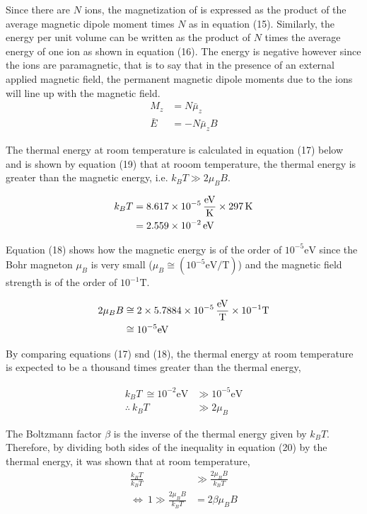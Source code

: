 \documentclass[a4paper,11pt]{article}
\begin{document}
Since there are $N$  ions, the magnetization of  is expressed as the product of the average magnetic dipole moment times $N$ as in equation (15). Similarly, the energy per unit volume can be written as the product of $N$ times the average energy of one  ion as shown in equation (16). The energy is negative however since the ions are paramagnetic, that is to say that in the presence of an external applied magnetic field, the permanent magnetic dipole moments due to the ions will line up with the magnetic field\cite{pellicane2018}.\\

\begin{align}
M_z	& = N \bar{\mu}_z\\
\bar{E}		& = - N \bar{\mu}_z B
\end{align}

The thermal energy at room temperature is calculated in equation (17) below and is shown by equation (19) that at rooom temperature, the thermal energy is greater than the magnetic energy, i.e. $k_B T \gg 2 \mu_B B$. 

\begin{align}
k_B T	& = \SI{8.617d-5}{\electronvolt\per\kelvin} \times \SI{297}{\kelvin}\nonumber\\
		& = \SI{2.559d-2}{\electronvolt}
\end{align}

Equation (18) shows how the magnetic energy is of the order of ${10^{-5}}\si{\electronvolt}$ since the Bohr magneton $\mu_B$ is very small ($\mu_B \cong (10^{-5}\si{\electronvolt\per\tesla})$) and the magnetic field strength is of the order of $10^{-1}\si{\tesla}$. 

\begin{align}
2 \mu_B B	& \cong 2 \times \SI{5.7884d-5}{\electronvolt\per\tesla} \times 10^{-1}\si{\tesla}\nonumber\\
            & \cong 10^{-5}\si{\electronvolt}
\end{align}

By comparing equations (17) snd (18), the thermal energy at room temperature is expected to be a thousand times greater than the thermal energy,

\begin{align}
k_B T ~ \cong 10^{-2}\si{\electronvolt}	& \gg 10^{-5}\si{\electronvolt}\nonumber\\
\therefore ~ k_B T	& \gg 2 \mu_ B
\end{align}

The Boltzmann factor $\beta$ is the inverse of the thermal energy given by $k_B T$. Therefore, by dividing both sides of the inequality in equation (20) by the thermal energy, it was shown that at room temperature, 
\begin{align}
\frac{k_B T}{k_B T}	& \gg \frac{2 \mu_B B}{k_B T}\nonumber\\
\iff~1	\gg \frac{2 \mu_B B}{k_B T}	& = 2 \beta \mu_B B
\end{align} 
\end{document}
